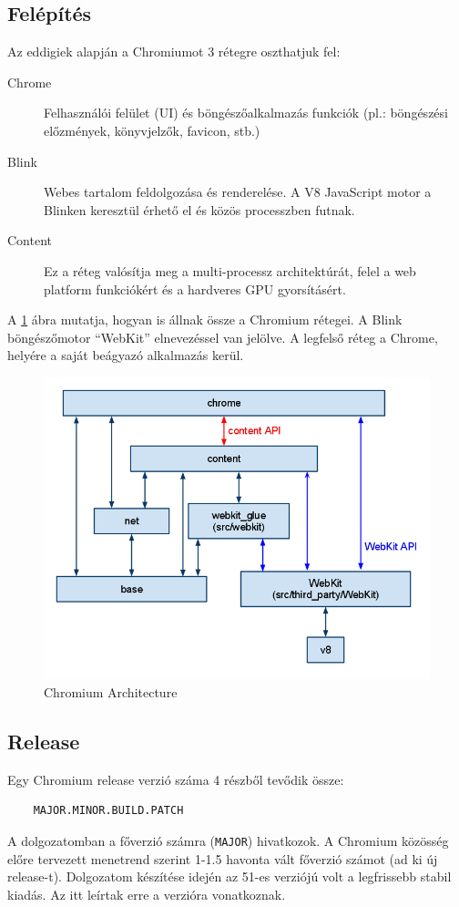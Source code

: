 \documentclass[12pt]{report}
\begin{document}
\subsection{Felépítés}
Az eddigiek alapján a Chromiumot 3 rétegre oszthatjuk fel:
\begin{description}
    \item[Chrome]
        Felhasználói felület (UI) és böngészőalkalmazás funkciók
        (pl.: böngészési előzmények, könyvjelzők, favicon, stb.)
    \item[Blink]
        Webes tartalom feldolgozása és renderelése. A V8 JavaScript motor a
        Blinken keresztül érhető el és közös processzben futnak.
    \item[Content]
        Ez a réteg valósítja meg a multi-processz architektúrát,
        felel a web platform funkciókért és a hardveres GPU gyorsításért.
\end{description}
A \ref{fig:chromium-architecture} ábra mutatja, hogyan is állnak össze a Chromium rétegei.
A Blink böngészőmotor ``WebKit'' elnevezéssel van jelölve.
A legfelső réteg a Chrome, helyére a saját beágyazó alkalmazás kerül.

\begin{figure}[ht]
    \centering
    \includegraphics[scale=0.6]{chromium-architecture}
    \caption{
        \label{fig:chromium-architecture}
        Chromium Architecture \cite{bib:chromium-content-module}
    }
\end{figure}


\subsection{Release}
Egy Chromium release verzió száma 4 részből tevődik össze:
\begin{verbatim}
    MAJOR.MINOR.BUILD.PATCH
\end{verbatim}
A dolgozatomban a főverzió számra (\texttt{MAJOR}) hivatkozok.
A Chromium közösség előre tervezett menetrend szerint 1-1.5 havonta vált főverzió számot
(ad ki új release-t).
Dolgozatom készítése idején az 51-es verziójú volt a legfrissebb stabil kiadás.
Az itt leírtak erre a verzióra vonatkoznak.
\end{document}
